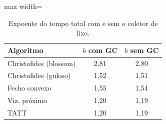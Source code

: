 \begin{table}[htb]
\centering
\caption{Expoente do tempo total com e sem o coletor de lixo.}
\label{tab:gc}
\small
\begin{adjustbox}{max width=\linewidth}
\begin{tabular}{lcc}
\toprule
Algoritmo & $b$ com GC & $b$ sem GC \\
\midrule
Christofides (blossom) & 2{,}81 & 2{,}80 \\
Christofides (guloso) & 1{,}52 & 1{,}51 \\
Fecho convexo & 1{,}55 & 1{,}54 \\
Viz. próximo & 1{,}20 & 1{,}19 \\
TATT & 1{,}20 & 1{,}19 \\
\bottomrule
\end{tabular}
\end{adjustbox}
\end{table}
